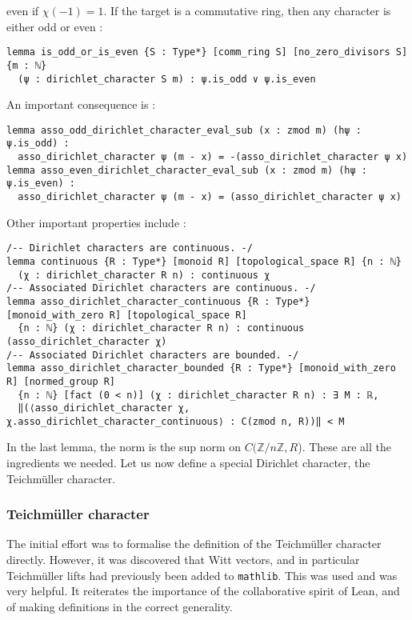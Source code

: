 \documentclass[a4paper,UKenglish,cleveref, autoref, thm-restate]{lipics-v2021}
\newcommand{\lean}[1]{\texttt{#1}\xspace} %
\begin{document}
even if $\chi (-1) = 1$. If the target is a commutative ring, then any character is 
either odd or even : 
\begin{lstlisting}
lemma is_odd_or_is_even {S : Type*} [comm_ring S] [no_zero_divisors S] {m : ℕ} 
  (ψ : dirichlet_character S m) : ψ.is_odd ∨ ψ.is_even
\end{lstlisting}
An important consequence is : 
\begin{lstlisting}
lemma asso_odd_dirichlet_character_eval_sub (x : zmod m) (hψ : ψ.is_odd) :
  asso_dirichlet_character ψ (m - x) = -(asso_dirichlet_character ψ x)
lemma asso_even_dirichlet_character_eval_sub (x : zmod m) (hψ : ψ.is_even) :
  asso_dirichlet_character ψ (m - x) = (asso_dirichlet_character ψ x)
\end{lstlisting}
Other important properties include : 
\begin{lstlisting}
/-- Dirichlet characters are continuous. -/
lemma continuous {R : Type*} [monoid R] [topological_space R] {n : ℕ} 
  (χ : dirichlet_character R n) : continuous χ
/-- Associated Dirichlet characters are continuous. -/
lemma asso_dirichlet_character_continuous {R : Type*} [monoid_with_zero R] [topological_space R] 
  {n : ℕ} (χ : dirichlet_character R n) : continuous (asso_dirichlet_character χ) 
/-- Associated Dirichlet characters are bounded. -/
lemma asso_dirichlet_character_bounded {R : Type*} [monoid_with_zero R] [normed_group R] 
  {n : ℕ} [fact (0 < n)] (χ : dirichlet_character R n) : ∃ M : ℝ,
  ‖(⟨asso_dirichlet_character χ, χ.asso_dirichlet_character_continuous⟩ : C(zmod n, R))‖ < M 
\end{lstlisting}
In the last lemma, the norm is the sup norm on $C(\mathbb{Z}/n \mathbb{Z}, R$). 
These are all the ingredients we needed. Let us now define a special Dirichlet character, the Teichmüller character.
\subsubsection{Teichmüller character}
The initial effort was to formalise the definition of the Teichmüller character directly. 
However, it was discovered that Witt vectors, and in particular Teichmüller lifts had previously 
been added to \lean{mathlib}. This was used and was very helpful. It reiterates the importance 
of the collaborative spirit of Lean, and of making definitions in the correct generality. 
\end{document}
